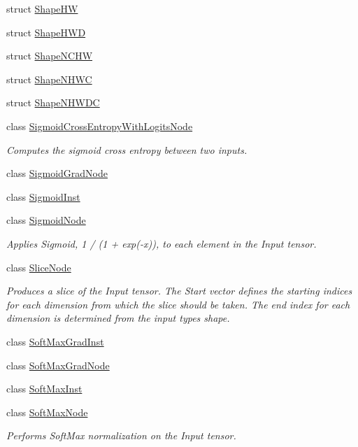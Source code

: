 \begin{DoxyCompactItemize}
struct \hyperlink{structglow_1_1_shape_h_w}{Shape\+HW}
\item 
struct \hyperlink{structglow_1_1_shape_h_w_d}{Shape\+H\+WD}
\item 
struct \hyperlink{structglow_1_1_shape_n_c_h_w}{Shape\+N\+C\+HW}
\item 
struct \hyperlink{structglow_1_1_shape_n_h_w_c}{Shape\+N\+H\+WC}
\item 
struct \hyperlink{structglow_1_1_shape_n_h_w_d_c}{Shape\+N\+H\+W\+DC}
\item 
class \hyperlink{classglow_1_1_sigmoid_cross_entropy_with_logits_node}{Sigmoid\+Cross\+Entropy\+With\+Logits\+Node}
\begin{DoxyCompactList}\small\item\em Computes the sigmoid cross entropy between two inputs. \end{DoxyCompactList}\item 
class \hyperlink{classglow_1_1_sigmoid_grad_node}{Sigmoid\+Grad\+Node}
\item 
class \hyperlink{classglow_1_1_sigmoid_inst}{Sigmoid\+Inst}
\item 
class \hyperlink{classglow_1_1_sigmoid_node}{Sigmoid\+Node}
\begin{DoxyCompactList}\small\item\em Applies Sigmoid, 1 / (1 + exp(-\/x)), to each element in the Input tensor. \end{DoxyCompactList}\item 
class \hyperlink{classglow_1_1_slice_node}{Slice\+Node}
\begin{DoxyCompactList}\small\item\em Produces a slice of the Input tensor. The Start vector defines the starting indices for each dimension from which the slice should be taken. The end index for each dimension is determined from the input type\textquotesingle{}s shape. \end{DoxyCompactList}\item 
class \hyperlink{classglow_1_1_soft_max_grad_inst}{Soft\+Max\+Grad\+Inst}
\item 
class \hyperlink{classglow_1_1_soft_max_grad_node}{Soft\+Max\+Grad\+Node}
\item 
class \hyperlink{classglow_1_1_soft_max_inst}{Soft\+Max\+Inst}
\item 
class \hyperlink{classglow_1_1_soft_max_node}{Soft\+Max\+Node}
\begin{DoxyCompactList}\small\item\em Performs Soft\+Max normalization on the Input tensor. \end{DoxyCompactList}\item 

\end{DoxyCompactItemize}

